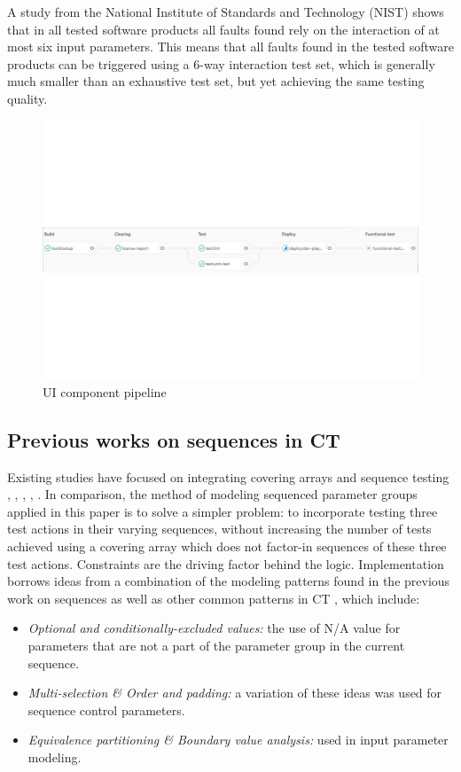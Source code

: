 \documentclass[conference]{IEEEtran}
\begin{document}
	A study from the National Institute of Standards and Technology (NIST) \cite{NISTpractical} shows
	that in all tested software products all faults found rely on the interaction of at most six input parameters.
	This means that all faults found in the tested software products can be triggered using a $6$-way interaction test set,
	which is generally much smaller than an exhaustive test set, but yet achieving the same testing quality.

	\begin{figure}[!t]
		\centering
		\includegraphics[width=1.00\textwidth]{UIpipeline.pdf}
		\caption{UI component pipeline}
		\label{fig:UIpipeline}
	\end{figure}

	\subsection{Previous works on sequences in CT} \label{Previous works on sequences}
	Existing studies have focused on integrating covering arrays and sequence testing \cite{kuhn2012combinatorial}, \cite{farchi2014combinatorial}, \cite{brain2012event}, \cite{yang2018effect}, \cite{erdem2011answer}.
	In comparison, the method of modeling sequenced parameter groups applied in this paper is to solve a simpler problem:
	to incorporate testing three test actions in their varying sequences, without increasing the number of tests achieved using a covering array which does not factor-in sequences of these three test actions.
	Constraints are the driving factor behind the logic. Implementation borrows ideas from a combination of the modeling patterns found in the previous work on sequences as well as other common patterns in CT \cite{segall2012common}, which include: 
	\begin{itemize}
		\item \textit{Optional and conditionally-excluded values:} the use of N/A value for parameters that are not a part of the parameter group in the current sequence.
		\item	\textit{Multi-selection \& Order and padding:} a variation of these ideas was used for sequence control parameters.
		\item \textit{Equivalence partitioning \& Boundary value analysis:} used in input parameter modeling.
	\end{itemize}
\end{document}
